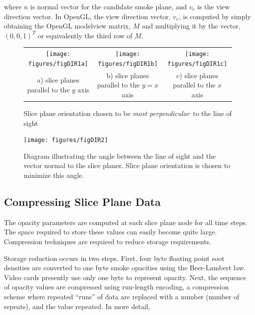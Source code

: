 \noindent where $n$ is normal vector for the candidate smoke plane, and $v_e$ is the view direction vector.  In OpenGL, the view direction vector, $v_e$, is computed by simply obtaining the OpenGL modelview matrix, $M$ and multiplying it by the vector, $(0,0,1)^T$ or equivalently the third row of $M$.

\begin{figure}
\begin{tabular}{ccc}
\texttt{[image: figures/figDIR1a]}&
\texttt{[image: figures/figDIR1b]}&
\texttt{[image: figures/figDIR1c]}\\
a) slice planes parallel to the $y$ axis& b) slice planes parallel to
the $y=x$ axis&
c) slice planes parallel to the $x$ axis\\
\end{tabular}
\caption{Slice plane orientation chosen to be {\em most perpendicular}\ to the line of sight }
\label{figDIRA}
\end{figure}

\begin{figure}
\centerline{\texttt{[image: figures/figDIR2]}}
\caption[Diagram illustrating the angle between the line of sight
and the vector normal to the slice planes.]{Diagram illustrating the angle between the line of sight
and the vector normal to the slice planes.  Slice plane orientation is chosen to minimize
this angle.} \label{figDIRB}
\end{figure}


\subsection{Compressing Slice Plane Data}

The opacity parameters are computed at each slice plane node for all time steps. The space required to store these values can easily become quite large. Compression techniques are required to reduce storage requirements.

Storage reduction occurs in two steps.  First, four byte floating point soot densities are converted to one byte smoke opacities using the Beer-Lambert law.  Video cards presently use only one byte to represent opacity. Next, the sequence of opacity values are compressed using run-length encoding, a compression scheme where repeated ``runs'' of data are replaced with a number (number of repeats), and the value repeated.  In more detail,


